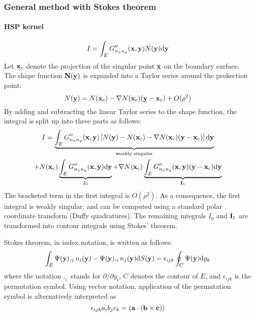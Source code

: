 \subsubsection{General method with Stokes theorem}

\paragraph{HSP kernel}

\begin{equation}
	I = \int_E G''_{n_x n_y}({\bf x}, {\bf y}) N({\bf y}) \mathrm{d} {\bf y}
\end{equation}
%
Let ${\bf x}_c$ denote the projection of the singular point ${\bf x}$ on the boundary surface.
The shape function ${\bf N}({\bf y})$ is expanded into a Taylor series around the prokection point:
%
\begin{equation}
	N({\bf y}) = N({\bf x}_c) - \nabla N({\bf x}_c) ({\bf y} - {\bf x}_c) + O(\rho^2)
\end{equation}
%
By adding and subtracting the linear Taylor series to the shape function, the integral is split up into three parts as follows:
%
\begin{multline}
	I = \underbrace{\int_E G''_{n_x n_y}({\bf x}, {\bf y})
	\left[ N({\bf y}) - N({\bf x}_c) - \nabla N({\bf x}_c) ({\bf y} - {\bf x}_c)\right]
	\mathrm{d} {\bf y}}_{\text{weakly singular}} \\
	+
	N({\bf x}_c)
	\underbrace{\int_E G''_{n_x n_y}({\bf x}, {\bf y})
	\mathrm{d} {\bf y}}_{I_0}
	+
	\nabla N({\bf x}_c)
	\underbrace{\int_E G''_{n_x n_y}({\bf x}, {\bf y})
	({\bf y} - {\bf x}_c)
	\mathrm{d} {\bf y}}_{{\bf I}_1}
\end{multline}
%
The bracketed term in the first integral is $O(\rho^2)$.
As a consequence, the first integral is weakly singular, and can be computed using a standard polar coordinate transform (Duffy quadratures).
The remaining integrals $I_0$ and ${\bf I}_1$ are transformed into contour integrals using Stokes' theorem.

Stokes theorem, in index notation, is written as follows:
%
\begin{equation}
	\int_E \Psi({\bf y}),_j n_i({\bf y}) - \Psi({\bf y}),_i n_j({\bf y}) \mathrm{d} S({\bf y}) = \epsilon_{ijk} \oint_C \Psi({\bf y}) \mathrm{d} y_k
\end{equation}
%
where the notation $,_i$ stands for $\partial/\partial y_i$, $C$ denotes the contour of $E$, and $\epsilon_{ijk}$ is the permutation symbol.
Using vector notation, application of the permutation symbol is alternatively interpreted as
%
\begin{equation}
	\epsilon_{ijk} a_i b_j c_k = \left({\bf a} \cdot \left({\bf b} \times {\bf c}\right)\right)
\end{equation}

